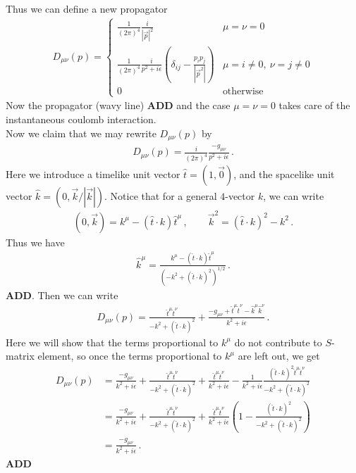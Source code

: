 \documentclass[11pt, onesided]{book}
\theoremstyle{break}
\theoremstyle{break}
\begin{document}
Thus we can define a new propagator
\begin{align*}
D_{\mu\nu}(p) = \begin{cases}
\frac{1}{(2\pi)^4} \frac{i}{|\vec{p}|^2} & \mu = \nu = 0\\
\frac{1}{(2\pi)^4} \frac{i}{p^2 + i\epsilon}\left( \delta_{ij} - \frac{p_ip_j}{|\vec{p}^2|}\right) &{\mu = i\neq 0}, \ \nu = j \neq 0\\
0 &\text{otherwise}
\end{cases}
\end{align*}
Now the propagator (wavy line) \textbf{ADD}
and the case $\mu = \nu = 0$ takes care of the instantaneous coulomb interaction.\\

Now we claim that we may rewrite $D_{\mu\nu}(p)$ by
\begin{align*}
D_{\mu\nu}(p) = \frac{i}{(2\pi)^4} \frac{-g_{\mu\nu}}{p^2 + i\epsilon}\,.
\end{align*}
Here we introduce a timelike unit vector $\hat{t} = (1,\vec{0})$, and the spacelike unit vector $\hat{k} = (0, \vec{k}/ |\vec{k}|)$. Notice that for a general $4$-vector $k$, we can write
\begin{align*}
(0,\vec{k}) = k^\mu - (\hat{t}\cdot k) \hat{t}^\mu\,,\qquad
\vec{k}^2 = (\hat{t}\cdot k)^2- k^2 \,.
\end{align*}
Thus we have
\begin{align*}
\hat{k}^\mu = \frac{k^\mu - (\hat{t} \cdot k) \hat{t}^\mu}{\left( - k^2 + (\hat{t} \cdot k)^2\right)^{1/2}}\,.
\end{align*}
\textbf{ADD}. Then we can write
\begin{align*}
D_{\mu\nu}(p) = \frac{\hat{t}^\mu \hat{t}^\nu}{-k^2 + (\hat{t}\cdot k)^2} + \frac{-g_{\mu\nu} + \hat{t}^\mu \hat{t}^\nu - \hat{k}^\mu \hat{k}^\nu}{k^2 + i\epsilon}\,.
\end{align*}
Here we will show that the terms proportional to $k^\mu$ do not contribute to $S$-matrix element, so once the terms proportional to $k^\mu$ are left out, we get
\begin{align*}
D_{\mu\nu}(p) 
&= \frac{-g_{\mu\nu}}{k^2 + i\epsilon} + \frac{\hat{t}^\mu \hat{t}^\nu}{-k^2 + (\hat{t}\cdot k)^2} + \frac{\hat{t}^\mu \hat{t}^\nu}{k^2 + i\epsilon} - \frac{1}{k^2 + i\epsilon}\frac{(\hat{t}\cdot k)^2 \hat{t}^\mu \hat{t}^\nu}{-k^2 + (\hat{t}\cdot k)^2}\\
&=  \frac{-g_{\mu\nu}}{k^2 + i\epsilon} + \frac{\hat{t}^\mu \hat{t}^\nu}{-k^2 + (\hat{t}\cdot k)^2} + \frac{\hat{t}^\mu \hat{t}^\nu}{k^2 + i\epsilon}\left( 1 - \frac{(\hat{t}\cdot k)^2}{-k^2 + (\hat{t}\cdot k)^2}\right) \\
&= \frac{-g_{\mu\nu}}{k^2 + i\epsilon} \,.
\end{align*}
\textbf{ADD}\\
\end{document}
